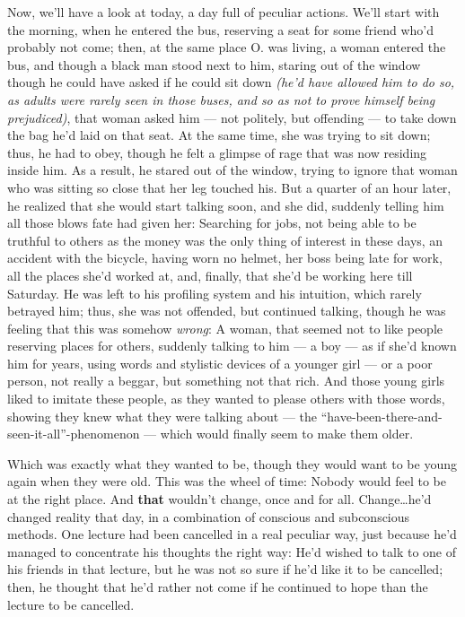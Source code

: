 Now, we'll have a look at today, a day full of peculiar actions. We'll start with the morning, when he entered the bus, reserving a seat for some friend who'd probably not come; then, at the same place O. was living, a woman entered the bus, and though a black man stood next to him, staring out of the window though he could have asked if he could sit down \emph{(he'd have allowed him to do so, as adults were rarely seen in those buses, and so as not to prove himself being prejudiced)}, that woman asked him --- not politely, but offending --- to take down the bag he'd laid on that seat. At the same time, she was trying to sit down; thus, he had to obey, though he felt a glimpse of rage that was now residing inside him. As a result, he stared out of the window, trying to ignore that woman who was sitting so close that her leg touched his. But a quarter of an hour later, he realized that she would start talking soon, and she did, suddenly telling him all those blows fate had given her: Searching for jobs, not being able to be truthful to others as the money was the only thing of interest in these days, an accident with the bicycle, having worn no helmet, her boss being late for work, all the places she'd worked at, and, finally, that she'd be working here till Saturday. He was left to his profiling system and his intuition, which rarely betrayed him; thus, she was not offended, but continued talking, though he was feeling that this was somehow \emph{wrong}: A woman, that seemed not to like people reserving places for others, suddenly talking to him --- a boy --- as if she'd known him for years, using words and stylistic devices of a younger girl --- or a poor person, not really a beggar, but something not that rich. And those young girls liked to imitate these people, as they wanted to please others with those words, showing they knew what they were talking about --- the \enquote{have-been-there-and-seen-it-all}-phenomenon --- which would finally seem to make them older.

Which was exactly what they wanted to be, though they would want to be young again when they were old. This was the wheel of time: Nobody would feel to be at the right place. 
And \textbf{that} wouldn't change, once and for all. Change\ldots he'd changed reality that day, in a combination of conscious and subconscious methods. One lecture had been cancelled in a real peculiar way, just because he'd managed to concentrate his thoughts the right way: He'd wished to talk to one of his friends in that lecture, but he was not so sure if he'd like it to be cancelled; then, he thought that he'd rather not come if he continued to hope than the lecture to be cancelled.

